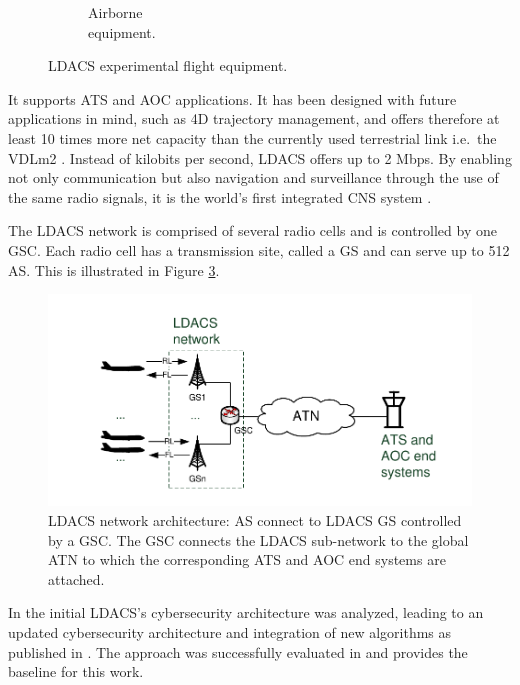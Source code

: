 \begin{figure}
\begin{subfigure}[b]{0.245\columnwidth}
        \caption{Airborne \\ equipment.}
        \label{fig:AirborneEquipment}
    \end{subfigure}
    \caption{LDACS experimental flight equipment.}
    \label{fig:flights}
\end{figure}

It supports \ac{ATS} and \ac{AOC} applications. It has been designed with future applications in mind, such as 4D trajectory management, and offers therefore at least 10 times more net capacity than the currently used terrestrial link i.e.\ the \ac{VDLm2} \cite{graeupl2019}. Instead of kilobits per second, LDACS offers up to 2 Mbps. By enabling not only communication but also navigation and surveillance through the use of the same radio signals, it is the world's first integrated \ac{CNS} system \cite{schnell2019}.

The LDACS network is comprised of several radio cells and is controlled by one \ac{GSC}. Each radio cell has a transmission site, called a \ac{GS} and can serve up to 512 \ac{AS}. This is illustrated in Figure \ref{fig:figure1}.

\begin{figure}
		\includegraphics[width=\columnwidth]{img/figure_1.pdf}
		 \caption{LDACS network architecture: \ac{AS} connect to LDACS \ac{GS} controlled by a \ac{GSC}. The GSC connects the LDACS sub-network to the global \ac{ATN} to which the corresponding \ac{ATS} and \ac{AOC} end systems are attached.}
 	\label{fig:figure1}
\end{figure}

In \cite{maeurer20181} the initial LDACS's cybersecurity architecture was analyzed, leading to an updated cybersecurity architecture and integration of new algorithms as published in \cite{maeurer20182,  maeurer20191}. The approach was successfully evaluated in \cite{maeurer20192} and provides the baseline for this work.
